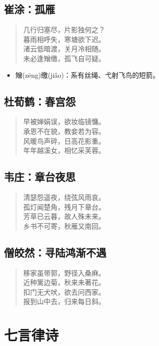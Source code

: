 \documentclass[12pt,oneside]{book}
\newenvironment{shici}{%
\begin{verse}\centering\yanti\large\hspace{12pt}}{\end{verse}}
\begin{document}
\begin{common-format}
\chapter{崔涂：孤雁}
\begin{shici}
几行归塞尽，片影独何之？\\
暮雨相呼失，寒塘欲下迟。\\
渚云低暗渡，关月冷相随。\\
未必逢矰缴，孤飞自可疑。
\end{shici}

\begin{itemize}
\item 矰(zēng)缴(jiǎo)：系有丝绳、弋射飞鸟的短箭。
\end{itemize}

\chapter{杜荀鹤：春宫怨}
\begin{shici}
早被婵娟误，欲妆临镜慵。\\
承恩不在貌，教妾若为容。\\
风暖鸟声碎，日高花影重。\\
年年越溪女，相忆采芙蓉。
\end{shici}

\chapter{韦庄：章台夜思}
\begin{shici}
清瑟怨遥夜，绕弦风雨哀。\\
孤灯闻楚角，残月下章台。\\
芳草已云暮，故人殊未来。\\
乡书不可寄，秋雁又南回。
\end{shici}

\chapter{僧皎然：寻陆鸿渐不遇}
\begin{shici}
移家虽带郭，野径入桑麻。\\
近种篱边菊，秋来未著花。\\
扣门无犬吠，欲去问西家。\\
报到山中去，归来每日斜。
\end{shici}


\part{七言律诗}

\end{common-format}
\end{document}
